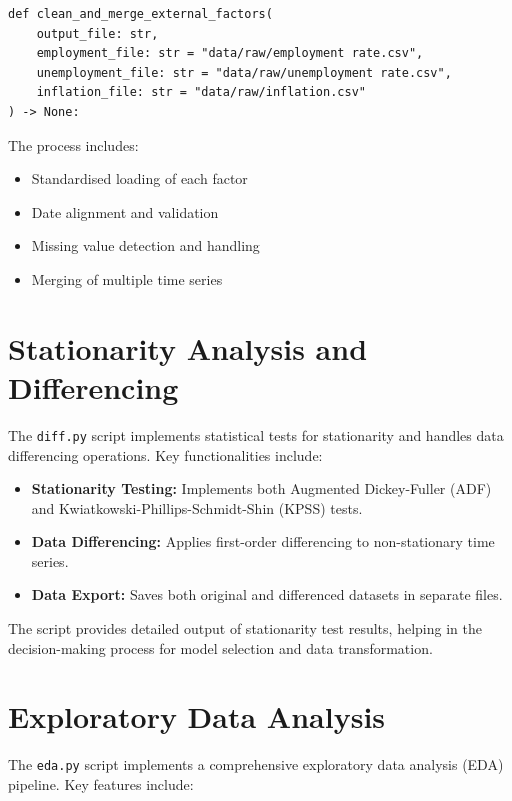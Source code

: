\documentclass[12pt,a4paper]{report}
\begin{document}
\begin{verbatim}
def clean_and_merge_external_factors(
    output_file: str,
    employment_file: str = "data/raw/employment rate.csv",
    unemployment_file: str = "data/raw/unemployment rate.csv",
    inflation_file: str = "data/raw/inflation.csv"
) -> None:
\end{verbatim}

The process includes:
\begin{itemize}
    \item Standardised loading of each factor
    \item Date alignment and validation
    \item Missing value detection and handling
    \item Merging of multiple time series
\end{itemize}

\section{Stationarity Analysis and Differencing}

The \texttt{diff.py} script implements statistical tests for stationarity and handles data differencing operations. Key functionalities include:

\begin{itemize}
    \item \textbf{Stationarity Testing:} Implements both Augmented Dickey-Fuller (ADF) and Kwiatkowski-Phillips-Schmidt-Shin (KPSS) tests.
    \item \textbf{Data Differencing:} Applies first-order differencing to non-stationary time series.
    \item \textbf{Data Export:} Saves both original and differenced datasets in separate files.
\end{itemize}

The script provides detailed output of stationarity test results, helping in the decision-making process for model selection and data transformation.

\section{Exploratory Data Analysis}

The \texttt{eda.py} script implements a comprehensive exploratory data analysis (EDA) pipeline. Key features include:
\end{document}
